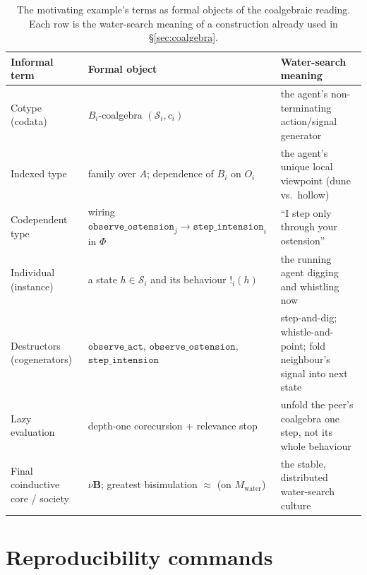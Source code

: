 \documentclass{article}
\newcommand{\method}[1]{\texttt{#1}}
\begin{document}
\begin{table}[t]
\caption{The motivating example's terms as formal objects of the coalgebraic
reading. Each row is the water-search meaning of a construction already used
in \S\ref{sec:coalgebra}.}
\label{tab:coalg-dictionary}
\centering
\small
\begin{tabular}{p{2.9cm} p{4.3cm} p{4.4cm}}
\toprule
Informal term & Formal object & Water-search meaning \\
\midrule
Cotype (codata) & $B_i$-coalgebra $(\mathcal{S}_i,c_i)$ & the agent's non-terminating action/signal generator \\
Indexed type & family over $A$; dependence of $B_i$ on $O_i$ & the agent's unique local viewpoint (dune vs.\ hollow) \\
Codependent type & wiring $\method{observe\_ostension}_j\!\to\!\method{step\_intension}_i$ in $\Phi$ & ``I step only through your ostension'' \\
Individual (instance) & a state $h\in\mathcal{S}_i$ and its behaviour $!_i(h)$ & the running agent digging and whistling now \\
Destructors (cogenerators) & $\method{observe\_act}$, $\method{observe\_ostension}$, $\method{step\_intension}$ & step-and-dig; whistle-and-point; fold neighbour's signal into next state \\
Lazy evaluation & depth-one corecursion + relevance stop & unfold the peer's coalgebra one step, not its whole behaviour \\
Final coinductive core / society & $\nu\mathbf{B}$; greatest bisimulation $\approx$ (on $M_{\mathrm{water}}$) & the stable, distributed water-search culture \\
\bottomrule
\end{tabular}
\end{table}


\section{Reproducibility commands}
\label{app:repro}
\end{document}

